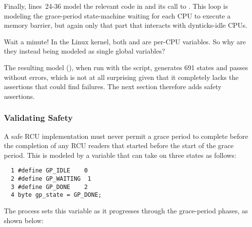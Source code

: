 Finally, lines~24-36 model the relevant code in
 and its call to
.
This loop is modeling the grace-period state-machine waiting for
each CPU to execute a memory barrier, but again only that part
that interacts with dynticks-idle CPUs.

\QuickQuiz{}
	Wait a minute!
	In the Linux kernel, both  and
	 are per-CPU variables.
	So why are they instead being modeled as single global variables?
 \QuickQuizEnd

The resulting model (),
when run with the
 script,
generates 691 states and
passes without errors, which is not at all surprising given that
it completely lacks the assertions that could find failures.
The next section therefore adds safety assertions.

\subsubsection{Validating Safety}
\label{sec:formal:Validating Safety}

A safe RCU implementation must never permit a grace period to
complete before the completion of any RCU readers that started
before the start of the grace period.
This is modeled by a  variable that
can take on three states as follows:

\vspace{5pt}
\begin{minipage}[t]{\columnwidth}
\begin{verbatim}
  1 #define GP_IDLE    0
  2 #define GP_WAITING  1
  3 #define GP_DONE    2
  4 byte gp_state = GP_DONE;
\end{verbatim}
\end{minipage}
\vspace{5pt}

The  process sets this variable as it
progresses through the grace-period phases, as shown below:


